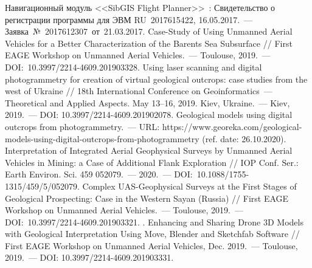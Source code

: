 \begin{thebibliography}{99}

\bibitem{} Навигационный модуль <<SibGIS Flight Planner>>~: Свидетельство о регистрации программы для ЭВМ RU~2017615422, 16.05.2017.~--- Заявка №~2017612307 от 21.03.2017.
\bibitem{} Case-Study of Using Unmanned Aerial Vehicles for a Better Characterization of the Barents Sea Subsurface // First EAGE Workshop on Unmanned Aerial Vehicles.~--- Toulouse, 2019.~--- DOI:~10.3997/2214-4609.201903328.
\bibitem{} Using laser scanning and digital photogrammetry for creation of virtual geological outcrops: case studies from the west of Ukraine // 18th International Conference on Geoinformatics~--- Theoretical and Applied Aspects. May 13--16, 2019. Kiev, Ukraine.~--- Kiev, 2019.~--- DOI: 10.3997/2214-4609.201902078.
\bibitem{}Geological models using digital outcrops from photogrammetry.~--- URL: https://www.georeka.com/geological\--models\--using\--digital\--outcrops\--from\--photogrammetry (ref. date: 26.10.2020).
\bibitem{} Interpretation of Integrated Aerial Geophysical Surveys by Unmanned Aerial Vehicles in Mining: a Case of Additional Flank Exploration // IOP Conf. Ser.: Earth Environ. Sci. 459 052079.~--- 2020.~--- DOI:~10.1088/1755-1315/459/5/052079.
\bibitem{} Complex UAS-Geophysical Surveys at the First Stages of Geological Prospecting: Case in the Western Sayan (Russia) // First EAGE Workshop on Unmanned Aerial Vehicles.~--- Toulouse, 2019.~--- DOI:~10.3997/2214-4609.201903321.
\bibitem{}. Enhancing and Sharing Drone 3D Models with Geological Interpretation Using Move, Blender and Sketchfab Software // First EAGE Workshop on Unmanned Aerial Vehicles, Dec. 2019.~--- Toulouse, 2019.~--- DOI: 10.3997/2214-4609.201903331.
\end{thebibliography}
